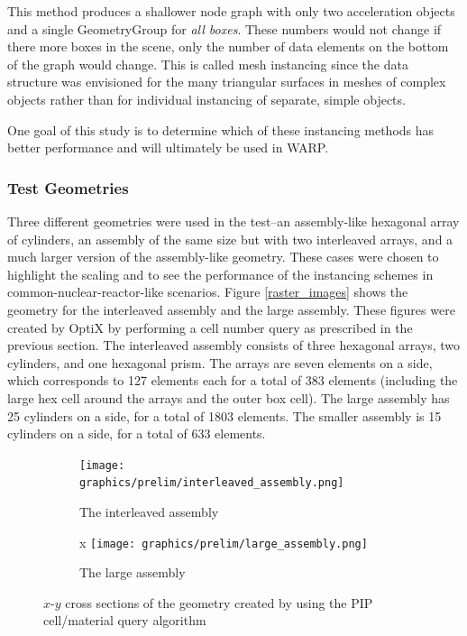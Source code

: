 This method produces a shallower node graph with only two acceleration objects and a single GeometryGroup for \emph{all boxes}.  These numbers would not change if there more boxes in the scene, only the number of data elements on the bottom of the graph would change.  This is called mesh instancing since the data structure was envisioned for the many triangular surfaces in meshes of complex objects rather than for individual instancing of separate, simple objects.

One goal of this study is to determine which of these instancing methods has better performance and will ultimately be used in WARP.

\subsubsection{Test Geometries}

Three different geometries were used in the test--an assembly-like hexagonal array of cylinders, an assembly of the same size but with two interleaved arrays, and a much larger version of the assembly-like geometry. These cases were chosen to highlight the scaling%
 and to see the performance of the instancing schemes in common-nuclear-reactor-like scenarios.  Figure \ref{raster_images} shows the geometry for the interleaved assembly and the large assembly.  These figures were created by OptiX by performing a cell number query as prescribed in the previous section.  The interleaved assembly consists of three hexagonal arrays, two cylinders, and one hexagonal prism.  The arrays are seven elements on a side, which corresponds to 127 elements each for a total of 383 elements (including the large hex cell around the arrays and the outer box cell).  The large assembly has 25 cylinders on a side, for a total of 1803 elements.  The smaller assembly is 15 cylinders on a side, for a total of 633 elements.

\begin{figure}[h!]
\centering
\begin{subfigure}{.5\textwidth}
  \centering
  \texttt{[image: graphics/prelim/interleaved\_assembly.png]}
  \caption{The interleaved assembly}
  \label{fig:sub1}
\end{subfigure}%
\begin{subfigure}{.5\textwidth}x
  \centering
  \texttt{[image: graphics/prelim/large\_assembly.png]}
  \caption{The large assembly}
  \label{fig:sub2}
\end{subfigure}
\caption{$x$-$y$ cross sections of the geometry created by using the PIP cell/material query algorithm \label{raster_images}}
\label{fig:test}
\end{figure}

